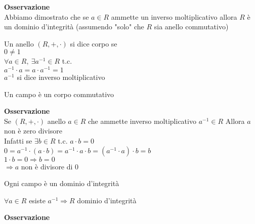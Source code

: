 \documentclass[12px]{article}
\begin{document}
\textbf{Osservazione}\\
Abbiamo dimostrato che se $a\in R$ ammette un inverso moltiplicativo allora  $R$ è un dominio d'integrità (assumendo "solo" che $R$ sia anello commutativo)\\
\begin{defi}
	Un anello $(R,+, \cdot)$ si dice corpo se\\
	 $0\neq 1$\\
	 $\forall a\in R, \ \exists a^{-1}\in R$ t.c.\\
	 $a^{-1} \cdot a = a\cdot a^{-1} = 1$ \\
	 $a^{-1}$ si dice inverso moltiplicativo
\end{defi}
\begin{defi}
	Un campo è un corpo commutativo
\end{defi}
\textbf{Osservazione}\\
Se $(R, +,\cdot)$ anello $a\in R$ che ammette inverso moltiplicativo  $a^{-1}\in R $ Allora $a$ non è zero divisore\\
Infatti se $\exists b \in R$ t.c.  $a\cdot b = 0$ \\
$0 = a^{-1}\cdot (a\cdot b) = a^{-1}\cdot a\cdot b = (a^{-1}\cdot a) \cdot b = b$\\
$1\cdot b = 0 \Rightarrow  b = 0$ \\
 $ \Rightarrow a$ non è divisore di $0$\\
  \begin{coro}
 	Ogni campo è un dominio d'integrità 
 \end{coro}
 \begin{dimo}
	 $\forall a\in R$ esiste  $a^{-1} \Rightarrow R$ dominio d'integrità
 \end{dimo}
 \textbf{Osservazione}\\
\end{document}
